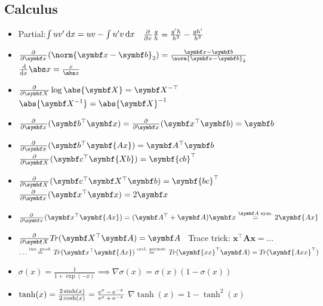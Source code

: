 \columnbreak
\subsection{Calculus}

\begin{itemize}
    \item Partial:\enskip $\int u v' \operatorname{d \!} x = u v - \int u' v \operatorname{d \!} x$
        \quad\textbullet\,
        $\pderiv{}{x} \frac{g}{h} = \frac{g'h}{h^2} - \frac{gh'}{h^2}$
    \item $\pderiv{}{\symbf x} (\norm{\symbf x - \symbf b}_2) = \frac{\symbf x-\symbf b}{\norm{\symbf x-\symbf b}_2}$
        \quad\textbullet\,
        $\deriv{}{x} \abs x = \frac{x}{\abs x}$
    \item $\pderiv{}{\symbf X} \log \abs{\symbf X} = \symbf X^{-\top}$
        \quad\textbullet\,
        $\abs{\symbf X^{-1}} = \abs{\symbf X}^{-1}$
        
    \item $\pderiv{}{\symbf x} (\symbf b^\top\symbf  x) = \pderiv{}{\symbf x} (\symbf x^\top\symbf  b) = \symbf b$
    \item $\pderiv{}{\symbf x} (\symbf b^\top \symbf{Ax}) = \symbf A^\top \symbf b$
        \quad\textbullet\,
        $\pderiv{}{\symbf X} (\symbf c^\top \symbf{Xb}) = \symbf{cb}^\top$
    \item $\pderiv{}{\symbf X} (\symbf c^\top \symbf X^\top \symbf b) = \symbf{bc}^\top$
        \quad\textbullet\,
        $\pderiv{}{\symbf x} (\symbf x^\top \symbf x) = 2\symbf x$
    \item $\pderiv{}{\symbf x} (\symbf x^\top \symbf{Ax}) = (\symbf A^\top + \symbf A)\symbf x \overset{\symbf A\textrm{ sym.}}{=} 2\symbf{Ax}$
    \item $\pderiv{}{\symbf X} T\!r(\symbf X^\top \symbf A) = \symbf A$
        \quad\textbullet\,
        Trace trick:\enspace
            $\symbf x^\top \symbf{Ax} = \ldots$\\\hfill
            $\ldots \overset{\small\substack{\textrm{inn. prod.}}}{=} T\!r (\symbf x^\top \symbf{Ax}) \overset{\small\substack{\textrm{cycl. permut.}}}{=} T\!r(\symbf{xx}^\top \symbf A) = T\!r(\symbf{Axx}^\top)$
    \item $\sigma(x) = \frac{1}{1 + \exp(-x)} \implies \nabla\sigma(x) = \sigma(x)(1-\sigma(x))$
    \item $\tanh(x) = \frac{2\sinh(x)}{2\cosh(x)} = \frac{\operatorname{e}^x - \operatorname{e}^{-x}}{\operatorname{e}^x+\operatorname{e}^{-x}}$
        \hfill\textbullet\hfill
        $\nabla\tanh(x) {=} 1 {-} \tanh^2(x)$
\end{itemize}

